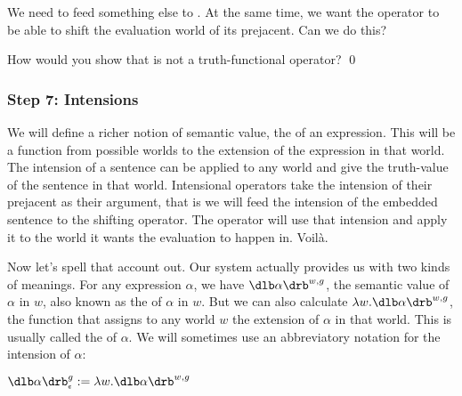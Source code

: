 \enlargethispage{18pt}We need to feed something else to . At the same time, we want the operator to be able to shift the
evaluation world of its prejacent. Can we do this?

\begin{exercise}\enlargethispage{18pt}
  How would you show that  is not a
  truth-functional operator? \qed
\end{exercise}

\subsubsection{Step 7: Intensions} \label{sec:intensions}

We will define a richer notion of semantic value, the  of an
expression. This will be a function from possible worlds to the extension of the
expression in that world. The intension of a sentence can be applied to any
world and give the truth-value of the sentence in that world. Intensional
operators take the intension of their prejacent as their argument, that is we
will feed the intension of the embedded sentence to the shifting operator. The
operator will use that intension and apply it to the world it wants the
evaluation to happen in. Voilà.

\enlargethispage{24pt}
%
Now let's spell that account out. Our system actually provides us with two kinds
of meanings. For any expression $\alpha$, we have $\sv{\alpha}^{w,g}$, the
semantic value of $\alpha$ in $w$, also known as the  of
$\alpha$ in $w$. But we can also calculate $\lambda w. \sv{\alpha}^{w,g}$, the
function that assigns to any world $w$ the extension of $\alpha$ in that world.
This is usually called the  of $\alpha$. We will sometimes use
an abbreviatory notation for the intension of $\alpha$:%

\clearpage
\ex{}%
$\svcent{\alpha}^g := \lambda w. \sv{\alpha}^{w,g}$ \xe

